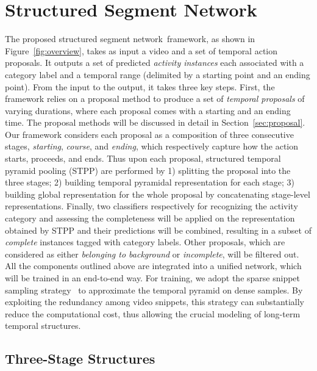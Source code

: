 \documentclass[10pt,twocolumn,letterpaper]{article}
\newcommand{\SSN}{structured segment network}
\begin{document}
\section{Structured Segment Network}
\label{sec:overview}

The proposed \SSN~framework, as shown in Figure~\ref{fig:overview},
takes as input a video and a set of temporal action proposals.
It outputs a set of predicted \emph{activity instances}
each associated with a category label and a temporal range (delimited
by a starting point and an ending point).
From the input to the output, it takes three key steps.
First, the framework relies on a proposal method to produce a set of \emph{temporal proposals}
of varying durations, where each proposal comes with a starting and an ending time.
The proposal methods will be discussed in detail in Section~\ref{sec:proposal}.
Our framework considers each proposal as a composition of
three consecutive stages, \emph{starting}, \emph{course}, and \emph{ending},
which respectively capture how the action starts, proceeds, and ends.
Thus upon each proposal, structured temporal pyramid pooling (STPP) are performed by 1) splitting the proposal into the three stages; 2) building temporal pyramidal representation for each stage; 3) building global representation for the whole proposal by concatenating stage-level representations.
Finally, two classifiers respectively for recognizing the activity category
and assessing the completeness will be applied on the representation obtained by STPP and their predictions
will be combined, resulting in a subset of \emph{complete} instances tagged with category labels.
Other proposals, which are considered as either \emph{belonging to background} or
\emph{incomplete}, will be filtered out.
All the components outlined above are integrated into a unified network,
which will be trained in an end-to-end way.
For training, we adopt the sparse snippet sampling strategy~\cite{Wang2016TSN}
to approximate the temporal pyramid on dense samples.
By exploiting the redundancy among video snippets, this strategy can substantially
reduce the computational cost, thus allowing the crucial modeling of long-term temporal
structures.

\vspace{-5pt}
\subsection{Three-Stage Structures}
\end{document}

